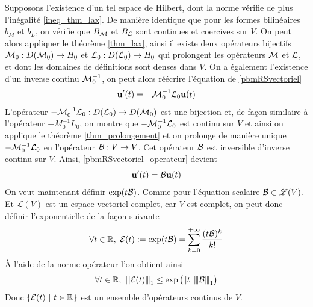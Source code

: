 %
%
Supposons l'existence d'un tel espace de Hilbert, dont la norme vérifie de plus l'inégalité \eqref{ineq_thm_lax}.
De manière identique que pour les formes bilinéaires $b_M$ et $b_L$, on vérifie que $B_{\mathcal{M}}$ et $B_{\mathcal{L}}$ sont continues et coercives sur $V$.
On peut alors appliquer le théorème \ref{thm_lax}, ainsi il existe deux opérateurs bijectifs $\mathcal{M}_0 : D(\mathcal{M}_0) \rightarrow H_0$ et $\mathcal{L}_0 : D(\mathcal{L}_0) \rightarrow H_0$ qui prolongent les opérateurs $\mathcal{M}$ et $\mathcal{L}$, et dont les domaines de définitions sont denses dans $V$.
On a également l'existence d'un inverse continu $\mathcal{M}_0^{-1}$, on peut alors réécrire l'équation de \eqref{pbmRSvectoriel}
\begin{equation}\label{pbmRSvectoriel_operateur}
    \bm{\mathrm{u}}'(t) = - \mathcal{M}_0^{-1}\mathcal{L}_0 \bm{\mathrm{u}}(t)
\end{equation}
L'opérateur $-\mathcal{M}_0^{-1}\mathcal{L}_0 : D(\mathcal{L}_0) \rightarrow D(\mathcal{M}_0)$ est une bijection et, de façon similaire à l'opérateur $-M_0^{-1}L_0$, on montre que $-\mathcal{M}_0^{-1}\mathcal{L}_0$ est continu sur $V$ et ainsi on applique le théorème \ref{thm_prolongement} et on prolonge de manière unique $-\mathcal{M}_0^{-1}\mathcal{L}_0$ en l'opérateur $\mathcal{B} : V \rightarrow V$.
Cet opérateur $\mathcal{B}$ est inversible d'inverse continu sur $V$.
Ainsi, \eqref{pbmRSvectoriel_operateur} devient 
\begin{equation}\label{pbmRSvectoriel_opB}
    \bm{\mathrm{u}}'(t) = \mathcal{B} \bm{\mathrm{u}}(t)
\end{equation}
On veut maintenant définir $\exp(t\mathcal{B})$. Comme pour l'équation 
scalaire $\mathcal{B} \in \mathscr{L}(V)$. Et $\mathscr{L}(V)$ est 
un espace vectoriel complet, car $V$ est complet, on peut donc 
définir l'exponentielle de la façon suivante
\begin{eqnarray*}
\forall t \in \mathbb{R},\  \mathcal{E}(t) := \exp(t\mathcal{B}) = \sum_{k=0}^{+\infty} \frac{(t\mathcal{B})^k}{k!}
\end{eqnarray*}
À l'aide de la norme opérateur l'on obtient ainsi
\begin{equation*}
    \forall t\in \mathbb{R}, \ \vertiii{\calE(t)}_1 \leq \exp\big(\abs{t}\vertiii{\calB}_1\big)
\end{equation*}
Donc $\{ \mathcal{E}(t) \ | \ t \in \mathbb{R} \} $ est un ensemble d'opérateurs continus de $V$.

